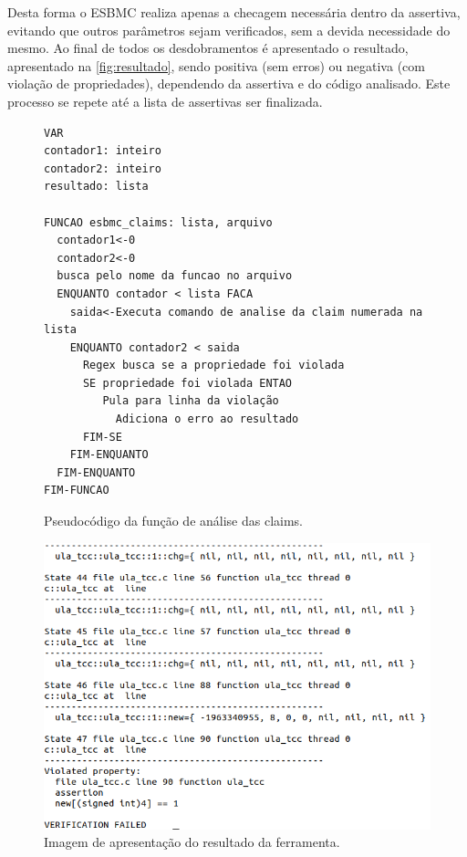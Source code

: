 \par
Desta forma o ESBMC realiza apenas a checagem necessária dentro da assertiva, evitando que outros parâmetros sejam verificados, sem a devida necessidade do mesmo. Ao final de todos os desdobramentos é apresentado o resultado, apresentado na \autoref{fig:resultado}, sendo positiva (sem erros) ou negativa (com violação de propriedades), dependendo da assertiva e do código analisado. Este processo se repete até a lista de assertivas ser finalizada.

\begin{figure}[H]
\caption{\label{fig:analise_claims}Pseudocódigo da função de análise das claims.}
	\begin{center}
    \begin{minipage}{0.7\textwidth}
    \begin{lstlisting}       
VAR
contador1: inteiro
contador2: inteiro
resultado: lista

FUNCAO esbmc_claims: lista, arquivo
  contador1<-0
  contador2<-0
  busca pelo nome da funcao no arquivo
  ENQUANTO contador < lista FACA
    saida<-Executa comando de analise da claim numerada na lista
    ENQUANTO contador2 < saida
      Regex busca se a propriedade foi violada
      SE propriedade foi violada ENTAO
         Pula para linha da violação
	       Adiciona o erro ao resultado       
      FIM-SE  
    FIM-ENQUANTO
  FIM-ENQUANTO
FIM-FUNCAO
    \end{lstlisting}
    \end{minipage}
	\end{center}
\end{figure}

\begin{figure}[H]
	\begin{center}
    \caption{\label{fig:resultado}Imagem de apresentação do resultado da ferramenta.}
	\includegraphics[scale=0.6]{Figuras/erro_assert.png}
	\end{center}
\end{figure}
